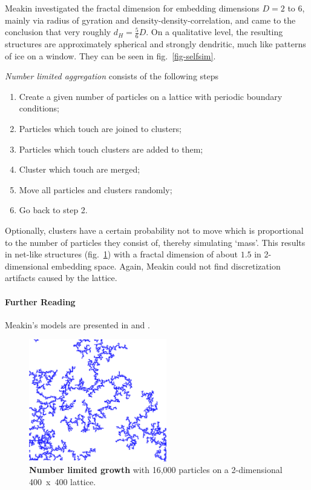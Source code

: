 \documentclass[twocolumn,10pt]{scrartcl}
\begin{document}
        Meakin investigated the fractal dimension for embedding dimensions $D=2$ to 6, mainly via radius of gyration
        and density-density-correlation, and came to the conclusion that very roughly $d_H=\frac{5}{6}D$.
        On a qualitative level, the resulting structures are approximately spherical and strongly dendritic,
        much like patterns of ice on a window. They can be seen in fig.~\ref{fig-selfsim}.

        \emph{Number limited aggregation} consists of the following steps
        \begin{enumerate}
            \item Create a given number of particles on a lattice with periodic boundary conditions;
            \item Particles which touch are joined to clusters;
            \item Particles which touch clusters are added to them;
            \item Cluster which touch are merged;
            \item Move all particles and clusters randomly;
            \item Go back to step 2.
        \end{enumerate}
        Optionally, clusters have a certain probability not to move which is proportional to the number of particles
        they consist of, thereby simulating `mass'. This results in net-like structures (fig.~\ref{fig-meakin2}) with a
        fractal dimension of about $1.5$ in 2-dimensional embedding space. Again, Meakin could not find discretization
        artifacts caused by the lattice.

        {\small
            \paragraph{Further Reading}
            Meakin's models are presented in \cite{src-meakin1} and \cite{src-meakin2}.
        }

        \begin{figure}
            \center
            \includegraphics[width=6cm]{img/meakin2.png}
            \caption[Number limited growth]
                {\small\textbf{Number limited growth} with 16,000 particles on a 2-dimensional 400~x~400 lattice.}
            \label{fig-meakin2}
        \end{figure}
\end{document}
